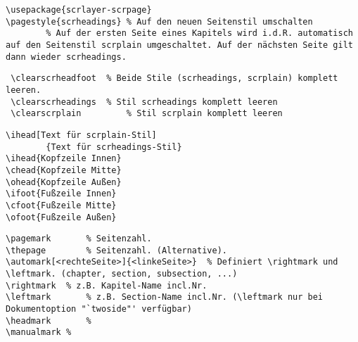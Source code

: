 \columnbreak
{}
\negAbstand

\begin{lstlisting}
\usepackage{scrlayer-scrpage}
\pagestyle{scrheadings}	% Auf den neuen Seitenstil umschalten
		% Auf der ersten Seite eines Kapitels wird i.d.R. automatisch auf den Seitenstil scrplain umgeschaltet. Auf der nächsten Seite gilt dann wieder scrheadings.
\end{lstlisting}

\noindent\begin{minipage}{\linewidth}

\negAbstand

\begin{lstlisting}
 \clearscrheadfoot	% Beide Stile (scrheadings, scrplain) komplett leeren.
 \clearscrheadings	% Stil scrheadings komplett leeren
 \clearscrplain			% Stil scrplain komplett leeren
\end{lstlisting}
\end{minipage}
\negAbstand

\negAbstand

\begin{lstlisting}
\ihead[Text für scrplain-Stil] 
		{Text für scrheadings-Stil}
\ihead{Kopfzeile Innen}
\chead{Kopfzeile Mitte}
\ohead{Kopfzeile Außen}
\ifoot{Fußzeile Innen}
\cfoot{Fußzeile Mitte}
\ofoot{Fußzeile Außen}
\end{lstlisting}


\posAbstand
{}\vspace{-0.6\baselineskip}
\begin{lstlisting}
\pagemark		% Seitenzahl.
\thepage		% Seitenzahl. (Alternative).
\automark[<rechteSeite>]{<linkeSeite>}	% Definiert \rightmark und \leftmark. (chapter, section, subsection, ...)
\rightmark	% z.B. Kapitel-Name incl.Nr.
\leftmark		% z.B. Section-Name incl.Nr. (\leftmark nur bei Dokumentoption "`twoside"' verfügbar)
\headmark		% 
\manualmark	% 
\end{lstlisting}

